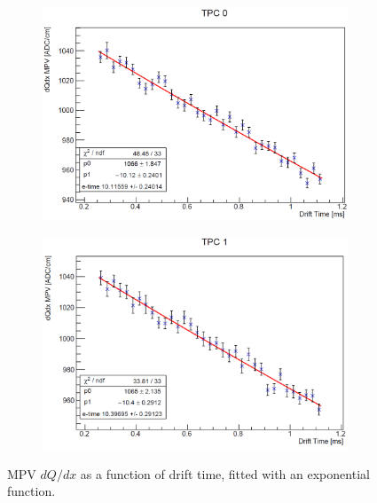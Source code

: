 \begin{figure}[htbp!]
        \centering
        \begin{subfigure}[b]{0.495\textwidth}
            \centering
            \includegraphics[width=\textwidth]{etime_tpc0}
        \end{subfigure}
        \hfill
        \begin{subfigure}[b]{0.495\textwidth}  
            \centering 
            \includegraphics[width=\textwidth]{etime_tpc1}
        \end{subfigure}
        \caption[Most Probable Value dQ/dx Against Drift Time]{MPV $dQ/dx$ as a function of drift time, fitted with an exponential function.}
        \label{fig:etime_tpc}
\end{figure}

